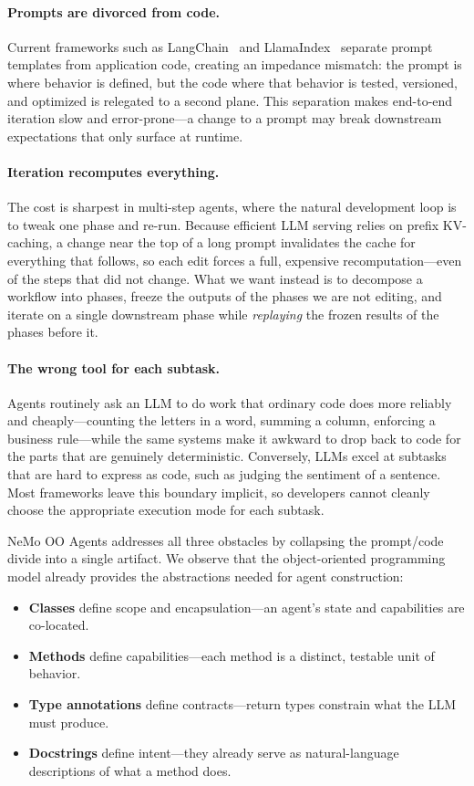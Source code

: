 \documentclass[11pt, logo, onecolumn, copyright, colorlinks=true, allcolors=blue]{nvidiatechreport}
\begin{document}
\paragraph{Prompts are divorced from code.} Current frameworks such as
LangChain~\cite{langchain2023} and LlamaIndex~\cite{llamaindex2023} separate
prompt templates from application code, creating an impedance mismatch: the
prompt is where behavior is defined, but the code where that behavior is tested,
versioned, and optimized is relegated to a second plane. This separation makes
end-to-end iteration slow and error-prone---a change to a prompt may break
downstream expectations that only surface at runtime.

\paragraph{Iteration recomputes everything.} The cost is sharpest in multi-step
agents, where the natural development loop is to tweak one phase and re-run.
Because efficient LLM serving relies on prefix KV-caching, a change near the top
of a long prompt invalidates the cache for everything that follows, so each edit
forces a full, expensive recomputation---even of the steps that did not change.
What we want instead is to decompose a workflow into phases, freeze the outputs of
the phases we are not editing, and iterate on a single downstream phase while
\emph{replaying} the frozen results of the phases before it.

\paragraph{The wrong tool for each subtask.} Agents routinely ask an LLM to do
work that ordinary code does more reliably and cheaply---counting the letters in
a word, summing a column, enforcing a business rule---while the same systems make
it awkward to drop back to code for the parts that are genuinely deterministic.
Conversely, LLMs excel at subtasks that are hard to express as code, such as
judging the sentiment of a sentence. Most frameworks leave this boundary
implicit, so developers cannot cleanly choose the appropriate execution mode for
each subtask.

NeMo OO Agents addresses all three obstacles by collapsing the prompt/code divide
into a single artifact. We observe that the object-oriented programming model
already provides the abstractions needed for agent construction:

\begin{itemize}
  \item \textbf{Classes} define scope and encapsulation---an agent's state and
        capabilities are co-located.
  \item \textbf{Methods} define capabilities---each method is a distinct,
        testable unit of behavior.
  \item \textbf{Type annotations} define contracts---return types constrain
        what the LLM must produce.
  \item \textbf{Docstrings} define intent---they already serve as natural-language
        descriptions of what a method does.
\end{itemize}
\end{document}
